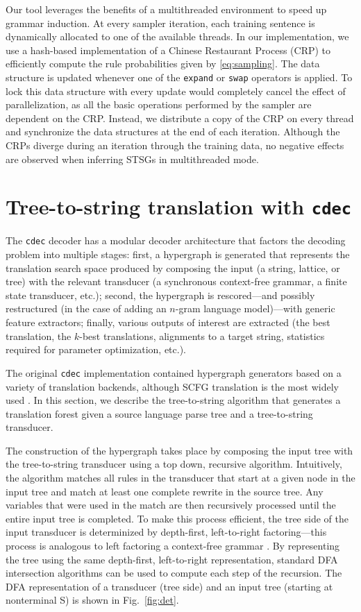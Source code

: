 \documentclass[nofonts]{pbml} %
\begin{document}
Our tool leverages the benefits of a multithreaded environment to speed up grammar induction. At every sampler iteration, each training sentence is dynamically allocated to one of the available threads. In our implementation, we use a hash-based implementation of a Chinese Restaurant Process (CRP) \citep{Teh2010} to efficiently compute the rule probabilities given by \autoref{eq:sampling}. The data structure is updated whenever one of the \texttt{expand} or \texttt{swap} operators is applied. To lock this data structure with every update would completely cancel the effect of parallelization, as all the basic operations performed by the sampler are dependent on the CRP. Instead, we distribute a copy of the CRP on every thread and synchronize the data structures at the end of each iteration. Although the CRPs diverge during an iteration through the training data, no negative effects are observed when inferring STSGs in multithreaded mode.

\section{Tree-to-string translation with {\tt cdec}}
\label{sec:cdec}

The {\tt cdec} decoder \citep{Dyer_etal_2010} has a modular decoder architecture that factors the decoding problem into multiple stages: first, a hypergraph is generated that represents the translation search space produced by composing the input (a string, lattice, or tree) with the relevant transducer (a synchronous context-free grammar, a finite state transducer, etc.); second, the hypergraph is rescored---and possibly restructured (in the case of adding an $n$-gram language model)---with generic feature extractors; finally, various outputs of interest are extracted (the best translation, the $k$-best translations, alignments to a target string, statistics required for parameter optimization, etc.).

The original {\tt cdec} implementation contained hypergraph generators based on a variety of translation backends, although SCFG translation is the most widely used \citep{chiang:2007}. In this section, we describe the tree-to-string algorithm that generates a translation forest given a source language parse tree and a tree-to-string transducer.

The construction of the hypergraph takes place by composing the input tree with the tree-to-string transducer using a top down, recursive algorithm. Intuitively, the algorithm matches all rules in the transducer that start at a given node in the input tree and match at least one complete rewrite in the source tree. Any variables that were used in the match are then recursively processed until the entire input tree is completed. To make this process efficient, the tree side of the input transducer is determinized by depth-first, left-to-right factoring---this process is analogous to left factoring a context-free grammar \citep{klein:2001}. By representing the tree using the same depth-first, left-to-right representation, standard DFA intersection algorithms can be used to compute each step of the recursion. The DFA representation of a transducer (tree side) and an input tree (starting at nonterminal S) is shown in Fig.~\ref{fig:det}.
\end{document}

